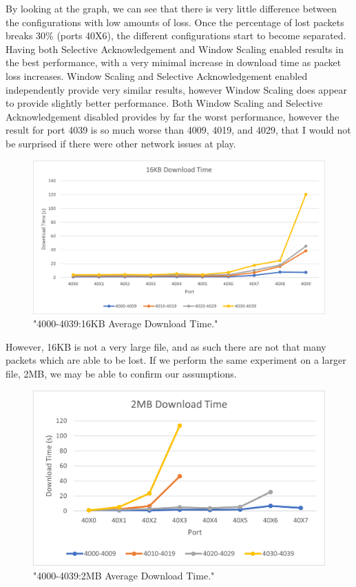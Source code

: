 \documentclass[12pt]{article}
\begin{document}
By looking at the graph, we can see that there is very little difference between the configurations with low amounts of loss.
Once the percentage of lost packets breaks 30\% (ports 40X6), the different configurations start to become separated.
Having both Selective Acknowledgement and Window Scaling enabled results in the best performance, with a very minimal increase in download time as packet loss increases.
Window Scaling and Selective Acknowledgement enabled independently provide very similar results, however Window Scaling does appear to provide slightly better performance.
Both Window Scaling and Selective Acknowledgement disabled provides by far the worst performance, however the result for port 4039 is so much worse than 4009, 4019, and 4029, that I would not be surprised if there were other network issues at play.

\begin{figure}[!htbp]
  \centering
  \includegraphics[width=\linewidth]{4000-4039-16KB-download-time.png}
  \caption{"4000-4039:16KB Average Download Time."}
  \label{figure13: 4000-4039:16KB Average Download Time}
\end{figure}

However, 16KB is not a very large file, and as such there are not that many packets which are able to be lost.
If we perform the same experiment on a larger file, 2MB, we may be able to confirm our assumptions.

\begin{figure}[!htbp]
  \centering
  \includegraphics[width=\linewidth]{4000-4039-2MB-download-time.png}
  \caption{"4000-4039:2MB Average Download Time."}
  \label{figure14: 4000-4039:2MB Average Download Time}
\end{figure}
\end{document}
